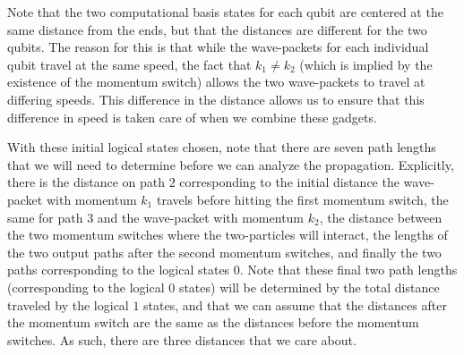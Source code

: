 \documentclass[../thesis-main/thesis-main]{subfiles}
\begin{document}
 Note that the two computational basis states for each qubit are centered at the same distance from the ends, but that the distances are different for the two qubits.  The reason for this is that while the wave-packets for each individual qubit travel at the same speed, the fact that $k_1\neq k_2$ (which is implied by the existence of the momentum switch) allows the two wave-packets to travel at differing speeds.  This difference in the distance allows us to ensure that this difference in speed is taken care of when we combine these gadgets.
 
With these initial logical states chosen, note that there are seven path lengths that we will need to determine before we can analyze the propagation.  Explicitly, there is the distance on path $2$ corresponding to the initial distance the wave-packet with momentum $k_1$ travels before hitting the first momentum switch, the same for path $3$ and the wave-packet with momentum $k_2$, the distance between the two momentum switches where the two-particles will interact, the lengths of the two output paths after the second momentum switches, and finally the two paths corresponding to the logical states $0$.  Note that these final two path lengths (corresponding to the logical $0$ states) will be determined by the total distance traveled by the logical $1$ states, and that we can assume that the distances after the momentum switch are the same as the distances before the momentum switches.  As such, there are three distances that we care about.
\end{document}
